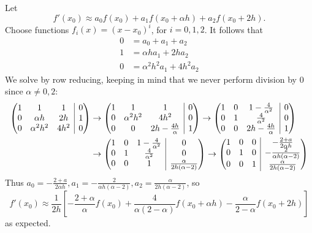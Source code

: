 \documentclass{eh-homework}
\begin{document}
\begin{question}{5}
\begin{enumerate}[label=\alph*.]
    Let
    \[
        f'(x_0) \approx a_0 f(x_0) + a_1 f(x_0 + \alpha h) + a_2 f(x_0 + 2h).
    \]
    Choose functions \(f_i(x) = (x - x_0)^i\), for \(i = 0,1,2\). It follows that
    \begin{align*}
        0 &= a_0 + a_1 + a_2 \\
        1 &= \alpha h a_1 + 2h a_2 \\
        0 &= \alpha ^2 h^2 a_1 + 4h^2 a_2
    \end{align*}
    We solve by row reducing, keeping in mind that we never perform division by 0 since \(\alpha \neq 0,2\):
    \begin{align*}
        \left( \begin{array}{@{}ccc|c@{}}
            1 & 1 & 1 &  0 \\
            0 & \alpha h & 2h &  1 \\
            0 & \alpha^2 h^2 & 4h^2 &  0 \\
        \end{array} \right)
        &\rightarrow
        \left( \begin{array}{@{}ccc|c@{}}
            1 & 1 & 1 &  0 \\
            0 & \alpha^2 h^2 & 4h^2 &  0 \\
            0 & 0 & 2h - \frac{4h}{\alpha} &  1 \\
        \end{array} \right)
        \rightarrow
        \left( \begin{array}{@{}ccc|c@{}}
            1 & 0 & 1 - \frac{4}{\alpha^2} &  0 \\
            0 & 1 & \frac{4}{\alpha^2} &  0 \\
            0 & 0 & 2h - \frac{4h}{\alpha} &  1 \\
        \end{array} \right) \\
        &\rightarrow
        \left( \begin{array}{@{}ccc|c@{}}
            1 & 0 & 1 - \frac{4}{\alpha^2} &  0 \\
            0 & 1 & \frac{4}{\alpha^2} &  0 \\
            0 & 0 & 1 &  \frac{\alpha}{2h(\alpha - 2)} \\
        \end{array} \right)
        \rightarrow
        \left( \begin{array}{@{}ccc|c@{}}
            1 & 0 & 0 &  -\frac{2 + a}{2\alpha h} \\
            0 & 1 & 0 &  - \frac{2}{\alpha h(\alpha -2)} \\
            0 & 0 & 1 &  \frac{\alpha}{2h(\alpha - 2)} \\
        \end{array} \right)
    \end{align*}
    Thus \(a_0 = -\frac{2 + a}{2\alpha h}, a_1 = - \frac{2}{\alpha h(\alpha -2)}, a_2 = \frac{\alpha}{2h(\alpha - 2)}\), so
    \[
        f'(x_0) \approx \frac{1}{2h}\left[ -\frac{2+\alpha}{\alpha}f(x_0) + \frac{4}{\alpha (2 - \alpha)}f(x_0 + \alpha h) - \frac{\alpha}{2-\alpha}f(x_0 + 2h)\right] 
    \]
    as expected.
\end{enumerate}
\end{question}
\end{document}
